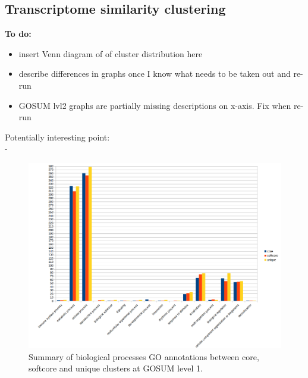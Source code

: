 \documentclass[12pt]{article}
\begin{document}
\subsection*{Transcriptome similarity clustering}
\textbf{To do:}
\begin{itemize}
\item insert Venn diagram of of cluster distribution here
\item describe differences in graphs once I know what needs to be taken out and re-run
\item GOSUM lvl2 graphs are partially missing descriptions on x-axis. Fix when re-run
\end{itemize}
Potentially interesting point:\\
- 

\FloatBarrier
\begin{figure} 
\includegraphics[scale=.58]{3Aug18_cluster-investigation/figures/gosum-pan/Pan-gosum1-bio-graph.png} 
\caption{Summary of biological processes GO annotations between core, softcore and unique clusters at GOSUM level 1.} 
\label{fig:PanGo1Bio}
\end{figure} 
\FloatBarrier
\end{document}
